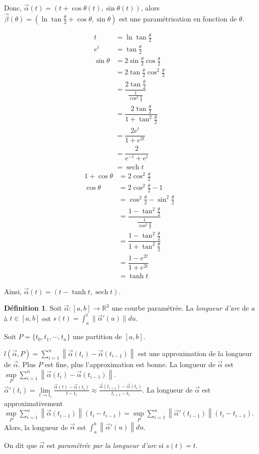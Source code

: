 \documentclass{report}
\theoremstyle{definition}
\newtheorem*{dfn}{D\'efinition}
\theoremstyle{remark}
\def\RR{\mathbb{R}}
\def\sech{\operatorname{sech}}
\newcommand*{\norme}[1]{\left\|#1\right\|}
\begin{document}
\begin{enumerate}[start=6]
		Donc, $\vec\alpha(t) = (t+\cos\theta(t), \sin\theta(t))$, alors $\vec\beta(\theta) = (\ln\tan\frac{\theta}{2} + \cos\theta, \sin\theta)$ est une param\'etrisation en fonction de $\theta$.

		\begin{align*}
			t&= \ln\tan\frac{\theta}{2}\\
			e^t&= \tan\frac{\theta}{2}\\
			\sin\theta&= 2\sin\frac{\theta}{2}\cos\frac{\theta}{2}\\
			&= 2\tan\frac{\theta}{2}\cos^2\frac{\theta}{2}\\
			&= \dfrac{2\tan\frac{\theta}{2}}{\frac{1}{\cos^2\frac{\theta}{2}}}\\
			&= \dfrac{2\tan\frac{\theta}{2}}{1+\tan^2\frac{\theta}{2}}\\
			&= \dfrac{2e^t}{1+e^{2t}}\\
			&= \dfrac{2}{e^{-t}+e^t}\\
			&= \sech t
		\end{align*}
		\begin{align*}
			1+\cos\theta&= 2\cos^2\frac{\theta}{2}\\
			\cos\theta&= 2\cos^2\frac{\theta}{2}-1\\
			&= \cos^2\frac{\theta}{2}-\sin^2\frac{\theta}{2}\\
			&= \dfrac{1-\tan^2\frac{\theta}{2}}{\frac{1}{\cos^2\frac{\theta}{2}}}\\
			&= \dfrac{1-\tan^2\frac{\theta}{2}}{1+\tan^2\frac{\theta}{2}}\\
			&= \dfrac{1-e^{2t}}{1+e^{2t}}\\
			&= \tanh t
		\end{align*}

		Ainsi, $\vec\alpha(t) = (t-\tanh t, \sech t)$.
	\end{enumerate}

	\begin{dfn}
		Soit $\vec\alpha:[a,b]\to\RR^3$ une courbe param\'etr\'ee. La \emph{longueur d'arc} de $a$ \`a $t\in[a,b]$ est $s(t) = \int_{a}^{t}\|\vec\alpha'(u)\|du$.

		Soit $P = \{t_0, t_1, \cdots, t_n\}$ une partition de $[a,b]$.

		$l(\vec\alpha, P) = \sum_{i=1}^{n} \norme{\vec\alpha(t_i) - \vec\alpha(t_{i-1})}$ est une approximation de la longueur de $\vec\alpha$. Plus $P$ est fine, plus l'approximation est bonne. La longueur de $\vec\alpha$ est $\sup\limits_P \sum_{i=1}^{n} \norme{\vec\alpha(t_i) - \vec\alpha(t_{i-1})}$. $\vec\alpha'(t_i) = \lim\limits_{t\to t_i} \frac{\vec\alpha(t) - \vec\alpha(t_i)}{t-t_i} \approx \frac{\vec\alpha(t_{i+1}) - \vec\alpha(t_i)}{t_{i+1}-t_i}$. La longueur de $\vec\alpha$ est approximativement $\sup\limits_P \sum_{i=1}^{n} \norme{\vec\alpha(t_{i-1})} (t_i-t_{i-1}) = \sup\limits_P \sum_{i=1}^{n} \norme{\vec\alpha'(t_{i-1})} (t_i-t_{i-1})$. Alors, la longueur de $\vec\alpha$ est $\int_{a}^{b} \norme{\vec\alpha'(u)} du$.

		On dit que $\vec\alpha$ est \emph{param\'etr\'ee par la longueur d'arc} si $s(t)=t$.
	\end{dfn}
\end{document}
